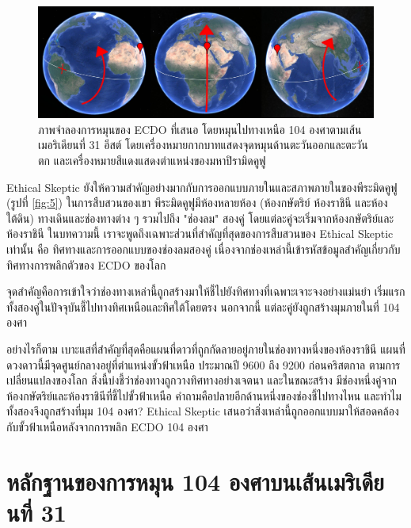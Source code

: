 \documentclass[10pt,twocolumn,letterpaper]{article}
\begin{document}
\begin{figure}[b]
\begin{center}
\includegraphics[width=1\textwidth]{drawing.jpg}
\end{center}
   \caption{ภาพจำลองการหมุนของ ECDO ที่เสนอ โดยหมุนไปทางเหนือ 104 องศาตามเส้นเมอริเดียนที่ 31 อีสต์ โดยเครื่องหมายกากบาทแสดงจุดหมุนด้านตะวันออกและตะวันตก และเครื่องหมายสีแดงแสดงตำแหน่งของมหาปิรามิดคูฟู}
\label{fig:6}
\end{figure}
Ethical Skeptic ยังให้ความสำคัญอย่างมากกับการออกแบบภายในและสภาพภายในของพีระมิดคูฟู (รูปที่ \ref{fig:5}) ในการสืบสวนของเขา \cite{28} พีระมิดคูฟูมีห้องหลายห้อง (ห้องกษัตริย์ ห้องราชินี และห้องใต้ดิน) ทางเดินและช่องทางต่าง ๆ รวมไปถึง "ช่องลม" สองคู่ โดยแต่ละคู่จะเริ่มจากห้องกษัตริย์และห้องราชินี \cite{29,30} ในบทความนี้ เราจะพูดถึงเฉพาะส่วนที่สำคัญที่สุดของการสืบสวนของ Ethical Skeptic เท่านั้น คือ ทิศทางและการออกแบบของช่องลมสองคู่ เนื่องจากช่องเหล่านี้เข้ารหัสข้อมูลสำคัญเกี่ยวกับทิศทางการพลิกตัวของ ECDO ของโลก

จุดสำคัญคือการเข้าใจว่าช่องทางเหล่านี้ถูกสร้างมาให้ชี้ไปยังทิศทางที่เฉพาะเจาะจงอย่างแม่นยำ เริ่มแรก ทั้งสองคู่ในปัจจุบันชี้ไปทางทิศเหนือและทิศใต้โดยตรง นอกจากนี้ แต่ละคู่ยังถูกสร้างมุมภายในที่ 104 องศา

อย่างไรก็ตาม เบาะแสที่สำคัญที่สุดคือแผนที่ดาวที่ถูกกัดลายอยู่ภายในช่องทางหนึ่งของห้องราชินี แผนที่ดวงดาวนี้มีจุดศูนย์กลางอยู่ที่ตำแหน่งขั้วฟ้าเหนือ ประมาณปี 9600 ถึง 9200 ก่อนคริสตกาล ตามการเปลี่ยนแปลงของโลก \cite{28} สิ่งนี้บ่งชี้ว่าช่องทางถูกวางทิศทางอย่างเจตนา และในขณะสร้าง มีช่องหนึ่งคู่จากห้องกษัตริย์และห้องราชินีที่ชี้ไปขั้วฟ้าเหนือ คำถามคือปลายอีกด้านหนึ่งของช่องชี้ไปทางไหน และทำไมทั้งสองจึงถูกสร้างที่มุม 104 องศา? Ethical Skeptic เสนอว่าสิ่งเหล่านี้ถูกออกแบบมาให้สอดคล้องกับขั้วฟ้าเหนือหลังจากการพลิก ECDO 104 องศา

\section{หลักฐานของการหมุน 104 องศาบนเส้นเมริเดียนที่ 31}
\end{document}
